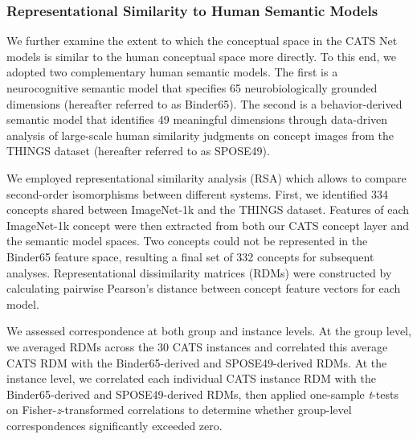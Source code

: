 \documentclass[pdflatex,sn-mathphys-num,lineno]{sn-jnl}%
\begin{document}
\begin{CJK}{UTF8}{gbsn}
\subsubsection{Representational Similarity to Human Semantic Models}
We further examine the extent to which the conceptual space in the CATS Net models is similar to the human conceptual space more directly. To this end, we adopted two complementary human semantic models. The first is a neurocognitive semantic model that specifies 65 neurobiologically grounded dimensions \cite{binder_toward_2016} (hereafter referred to as Binder65). The second is a behavior-derived semantic model that identifies 49 meaningful dimensions through data-driven analysis of large-scale human similarity judgments on concept images from the THINGS dataset \cite{hebart_revealing_2020} (hereafter referred to as SPOSE49).

We employed representational similarity analysis (RSA) \cite{kriegeskorte_representational_2008} which allows to compare second-order isomorphisms between different systems. First, we identified 334 concepts shared between ImageNet-1k and the THINGS dataset. Features of each ImageNet-1k concept were then extracted from both our CATS concept layer and the semantic model spaces. Two concepts could not be represented in the Binder65 feature space, resulting a final set of 332 concepts for subsequent analyses. Representational dissimilarity matrices (RDMs) were constructed by calculating pairwise Pearson’s distance between concept feature vectors for each model. 

We assessed correspondence at both group and instance levels. At the group level, we averaged RDMs across the 30 CATS instances and correlated this average CATS RDM with the Binder65-derived and SPOSE49-derived RDMs. At the instance level, we correlated each individual CATS instance RDM with the Binder65-derived and SPOSE49-derived RDMs, then applied one-sample \textit{t}-tests on Fisher-\textit{z}-transformed correlations to determine whether group-level correspondences significantly exceeded zero.


\end{CJK}
\end{document}
